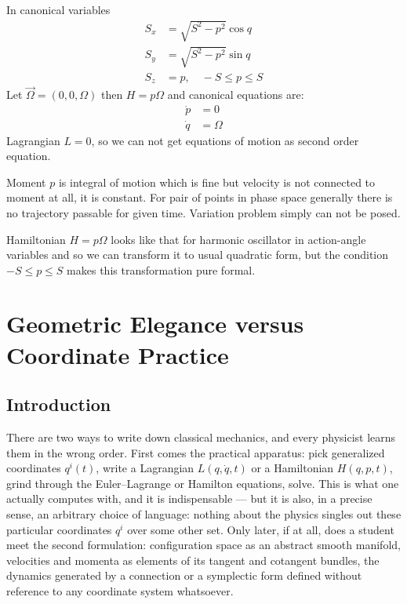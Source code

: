 In canonical variables 
\begin{equation}
   \label {sp3}
   \begin{split}
       S_x & = \sqrt{S^2-p^2} \cos q \\
       S_y & = \sqrt{S^2-p^2} \sin q \\
       S_z & = p,\quad -S\le p \le S
   \end{split}
\end{equation}
Let $ \vec \Omega =(0,0, \Omega) $ then $ H=p \Omega $ and canonical equations are:
\begin{equation}
   \label {sp4}
   \begin{split}
       \dot p & =0\\
       \dot q & = \Omega
   \end{split}
\end{equation}
Lagrangian $ L=0 $, so we can not get equations of motion as second order equation.

Moment $ p $ is integral of motion which is fine but velocity is not connected to 
moment at all, it is constant. For pair of points in phase space generally there is
no trajectory passable for given time. Variation problem simply can not be posed.

 Hamiltonian $ H=p \Omega $ looks like that for harmonic oscillator in action-angle variables
and so we can  transform it to usual quadratic form, but the condition $  -S\le p \le S$
makes this transformation pure formal.

\section{Geometric Elegance versus Coordinate Practice }
\label{cm:geom}

\subsection{Introduction}

There are two ways to write down classical mechanics, and every
physicist learns them in the wrong order. First comes the practical
apparatus: pick generalized coordinates $q^i(t)$, write a Lagrangian
$L(q,\dot q,t)$ or a Hamiltonian $H(q,p,t)$, grind through the
Euler--Lagrange or Hamilton equations, solve. This is what one
actually computes with, and it is indispensable --- but it is also,
in a precise sense, an arbitrary choice of language: nothing about
the physics singles out these particular coordinates $q^i$ over some
other set. Only later, if at all, does a student meet the second
formulation: configuration space as an abstract smooth manifold,
velocities and momenta as elements of its tangent and cotangent
bundles, the dynamics generated by a connection or a symplectic
form defined without reference to any coordinate system whatsoever.


